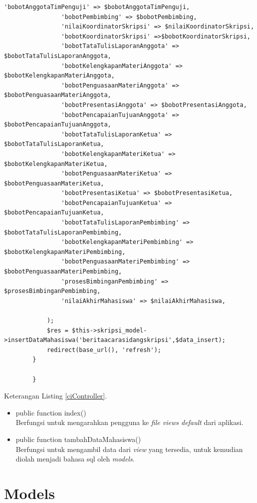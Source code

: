 \begin{lstlisting}[caption= File Controller, label= ciController]
				'bobotAnggotaTimPenguji' => $bobotAnggotaTimPenguji,
				'bobotPembimbing' => $bobotPembimbing,
				'nilaiKoordinatorSkripsi' => $nilaiKoordinatorSkripsi,
				'bobotKoordinatorSkripsi' =>$bobotKoordinatorSkripsi,
				'bobotTataTulisLaporanAnggota' => $bobotTataTulisLaporanAnggota,
				'bobotKelengkapanMateriAnggota' => $bobotKelengkapanMateriAnggota,
				'bobotPenguasaanMateriAnggota' => $bobotPenguasaanMateriAnggota,
				'bobotPresentasiAnggota' => $bobotPresentasiAnggota,
				'bobotPencapaianTujuanAnggota' => $bobotPencapaianTujuanAnggota,
				'bobotTataTulisLaporanKetua' => $bobotTataTulisLaporanKetua,
				'bobotKelengkapanMateriKetua' => $bobotKelengkapanMateriKetua,
				'bobotPenguasaanMateriKetua' => $bobotPenguasaanMateriKetua,
				'bobotPresentasiKetua' => $bobotPresentasiKetua,
				'bobotPencapaianTujuanKetua' => $bobotPencapaianTujuanKetua,
				'bobotTataTulisLaporanPembimbing' => $bobotTataTulisLaporanPembimbing,
				'bobotKelengkapanMateriPembimbing' => $bobotKelengkapanMateriPembimbing,
				'bobotPenguasaanMateriPembimbing' => $bobotPenguasaanMateriPembimbing,
				'prosesBimbinganPembimbing' => $prosesBimbinganPembimbing,
				'nilaiAkhirMahasiswa' => $nilaiAkhirMahasiswa,
		
			);
			$res = $this->skripsi_model->insertDataMahasiswa('beritaacarasidangskripsi',$data_insert);
			redirect(base_url(), 'refresh');
		}
		
		}
	\end{lstlisting}
	
	Keterangan Listing \ref{ciController}.
	\begin{itemize}
		\item public function index()\\
		Berfungsi untuk mengarahkan pengguna ke \textit{file views default} dari aplikasi.
		\item public function tambahDataMahasiswa()\\
		Berfungsi untuk mengambil data dari \textit{view} yang tersedia, untuk kemudian diolah menjadi bahasa sql oleh \textit{models}.
	\end{itemize}
	
	\section{Models}
	\label{sec: models}
	
